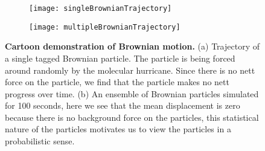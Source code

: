 
\begin{figure}
	\begin{subfigure}{0.49\textwidth}
		\texttt{[image: singleBrownianTrajectory]}
	\end{subfigure}
	\begin{subfigure}{0.49\textwidth}
		\texttt{[image: multipleBrownianTrajectory]}
	\end{subfigure}
	\caption{\textbf{Cartoon demonstration of Brownian motion.} (a) Trajectory of a single tagged Brownian particle. The particle is being forced around randomly by the molecular hurricane. Since there is no nett force on the particle, we find that the particle makes no nett progress over time. (b) An ensemble of Brownian particles simulated for 100 seconds, here we see that the mean displacement is zero because there is no background force on the particles, this statistical nature of the particles motivates us to view the particles in a probabilistic sense.
\label{fig:brownianMotion}}
\end{figure}

